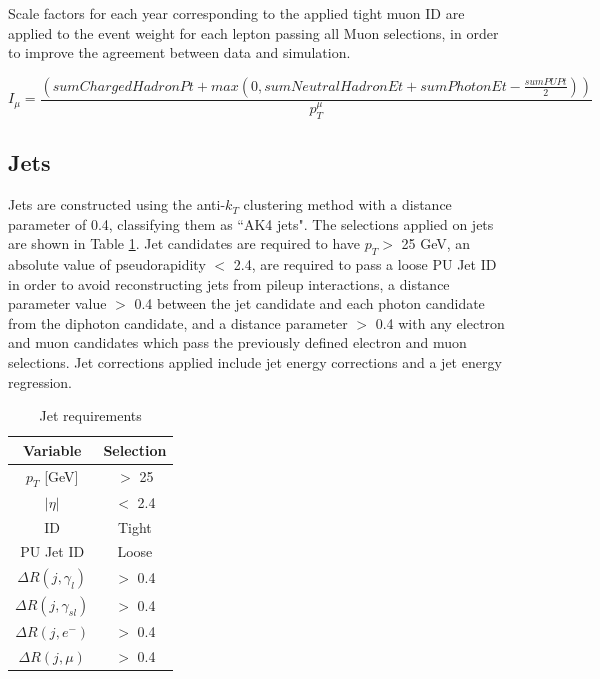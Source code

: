 Scale factors for each year corresponding to the applied tight muon ID are applied to the event weight for each lepton passing all Muon selections, in order to improve the agreement between data and simulation.

\begin{equation}
   I_{\mu} = \frac{( sumChargedHadronPt + max(0, sumNeutralHadronEt + sumPhotonEt - \frac{sumPUPt}{2}) )}{p^{\mu}_{T}}
   \label{eqn:MuonIsoDef}
\end{equation}
\subsection{Jets} \label{sec:Jets}

Jets are constructed using the anti-$k_{T}$ clustering method with a distance parameter of 0.4, classifying them as ``AK4 jets". The selections applied on jets are
shown in Table \ref{tab:JetSelections}. Jet candidates are 
required to have $p_{T} > $ 25 GeV, an absolute value of pseudorapidity $<$ 2.4, are required to pass a loose PU Jet ID in order to avoid reconstructing
jets from pileup interactions, a distance parameter value $>$ 0.4 between the jet 
candidate and each photon candidate from the diphoton candidate, and a distance parameter $>$ 0.4 with any electron and muon candidates which pass the previously defined 
electron and muon selections. Jet corrections applied include jet energy corrections and a jet energy regression.

\begin{table}[H]
    \begin{center}
        \begin{tabular}{c|c}
        Variable & Selection \\ \hline
        $p_{T}$ [GeV] & $>$ 25 \\
        $|\eta|$ & $<$ 2.4 \\
        ID & Tight \\
        PU Jet ID & Loose \\
        $\Delta R(j,\gamma_{l})$ & $>$ 0.4 \\
        $\Delta R(j,\gamma_{sl})$ & $>$ 0.4 \\
        $\Delta R(j,e^{-})$ & $>$ 0.4 \\
        $\Delta R(j,\mu)$ & $>$ 0.4 \\

        \end{tabular}
    \end{center}
    \caption{
        Jet requirements
    }
    \label{tab:JetSelections}
\end{table}

